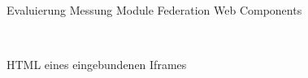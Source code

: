 \begin{figure}[hbt!]
	\centering
	\begin{minipage}[t]{1\textwidth}	
		\caption{Evaluierung Messung Module Federation Web Components}
		\\ %
		\label{fig:MessungMFWC}
	\end{minipage}
\end{figure}

\newpage
\begin{figure}[hbt!]
	\centering
	\begin{minipage}[t]{0.65\textwidth}	
		\caption{HTML eines eingebundenen Iframes}
		\\ %
		\label{fig:IFrameHTML}
	\end{minipage}
\end{figure}

